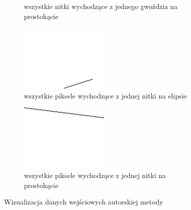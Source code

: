 \begin{figure}[H]
\begin{subfigure}{0.49\textwidth}
        \caption{wszystkie nitki wychodzące z jednego gwoździa na prostokącie}
        \label{wlasne-dane-slownikowe-4}
    \end{subfigure}
    \begin{subfigure}{0.49\textwidth}
        \centering
        \includegraphics[width = \textwidth]{img/4-mine/points-from-thread-of-elipse.png}
        \caption{wszystkie piksele wychodzące z jednej nitki na elipsie}
        \label{wlasne-dane-slownikowe-5}
    \end{subfigure}
    \begin{subfigure}{0.49\textwidth}
        \centering
        \includegraphics[width = \textwidth]{img/4-mine/points-from-thread-of-rectangle.png}
        \caption{wszystkie piksele wychodzące z jednej nitki na prostokącie}
        \label{wlasne-dane-slownikowe-6}
    \end{subfigure}
    \caption{Wizualizacja danych wejściowych autorskiej metody}
    \label{wlasne-dane-slownikowe}
    \end{figure}
    
